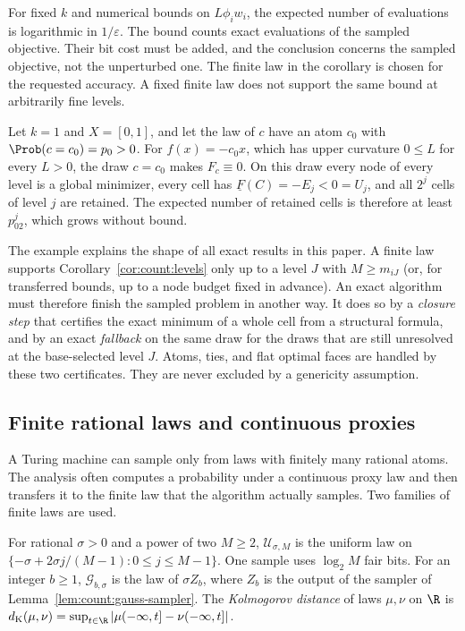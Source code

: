 For fixed $k$ and numerical bounds on $L\phi_iw_i$, the expected number of
evaluations is logarithmic in $1/\varepsilon$. The bound counts exact
evaluations of the sampled objective. Their bit cost must be added, and the
conclusion concerns the sampled objective, not the unperturbed one. The
finite law in the corollary is chosen for the requested accuracy. A fixed
finite law does not support the same bound at arbitrarily fine levels.

\begin{example}\label{ex:count:atom}
Let $k=1$ and $X=[0,1]$, and let the law of $c$ have an atom $c_0$ with
$\Prob(c=c_0)=p_0>0$. For $f(x)=-c_0x$, which has upper curvature $0\le L$
for every $L>0$, the draw $c=c_0$ makes $F_c\equiv0$. On this draw every node
of every level is a global minimizer, every cell has
$\underline F(C)=-E_j<0=U_j$, and all $2^j$ cells of level $j$ are retained.
The expected number of retained cells is therefore at least $p_02^j$, which
grows without bound.
\end{example}

The example explains the shape of all exact results in this paper. A finite
law supports Corollary~\ref{cor:count:levels} only up to a level $J$ with
$M\ge m_{iJ}$ (or, for transferred bounds, up to a node budget fixed in
advance). An exact algorithm must therefore finish the sampled problem in
another way. It does so by a \emph{closure step} that certifies the exact
minimum of a whole cell from a structural formula, and by an exact
\emph{fallback} on the same draw for the draws that are still unresolved at
the base-selected level $J$. Atoms, ties, and flat optimal faces are handled
by these two certificates. They are never excluded by a genericity
assumption.

\subsection{Finite rational laws and continuous proxies}\label{sec:count:laws}

A Turing machine can sample only from laws with finitely many rational atoms.
The analysis often computes a probability under a continuous proxy law and
then transfers it to the finite law that the algorithm actually samples. Two
families of finite laws are used.

\begin{definition}\label{def:count:laws}
For rational $\sigma>0$ and a power of two $M\ge2$, $\mathcal U_{\sigma,M}$
is the uniform law on $\{-\sigma+2\sigma j/(M-1):0\le j\le M-1\}$. One
sample uses $\log_2M$ fair bits. For an integer $b\ge1$,
$\mathcal G_{b,\sigma}$ is the law of $\sigma Z_b$, where $Z_b$ is the
output of the sampler of Lemma~\ref{lem:count:gauss-sampler}. The
\emph{Kolmogorov distance} of laws $\mu,\nu$ on $\R$ is
$d_{\rm K}(\mu,\nu)=\sup_{t\in\R}|\mu(-\infty,t]-\nu(-\infty,t]|$.
\end{definition}

